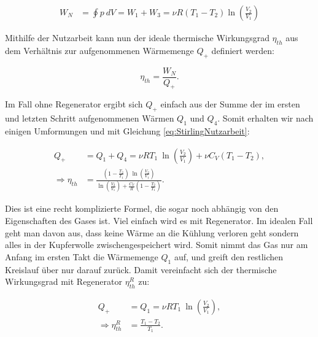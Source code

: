 \documentclass{article}
\begin{document}
\begin{equation}
    \begin{split}
        W_N &= \oint p \ dV = W_1 + W_3 = \nu R (T_1 - T_2) \ln{\left( \frac{V_2}{V_1} \right)}
    \end{split}
    \label{eq:StirlingNutzarbeit}
\end{equation}

Mithilfe der Nutzarbeit kann nun der ideale thermische Wirkungsgrad $\eta_{th}$ aus dem Verhältnis zur aufgenommenen Wärmemenge $Q_+$ definiert werden:

\begin{equation}
    \eta_{th} = \frac{W_N}{Q_+}.
\end{equation}

Im Fall ohne Regenerator ergibt sich $Q_+$ einfach aus der Summe der im ersten und letzten Schritt aufgenommenen Wärmen $Q_1$ und $Q_4$. Somit erhalten wir nach einigen Umformungen und mit Gleichung \ref{eq:StirlingNutzarbeit}:

\begin{equation}
    \begin{split}
        Q_+ &= Q_1 + Q_4 = \nu R T_1 \ \ln{\left( \frac{V_2}{V_1} \right)} + \nu C_V (T_1 - T_2), \\ 
        \Rightarrow \eta_{th} &= \frac{\left( 1 - \frac{T_2}{T_1} \right) \ \ln{\left( \frac{V_2}{V_1} \right)}}{\ln{\left( \frac{V_2}{V_1} \right)} + \frac{C_V}{R} \left( 1 - \frac{T_2}{T_1} \right)}.
    \end{split}
\end{equation}

Dies ist eine recht komplizierte Formel, die sogar noch abhängig von den Eigenschaften des Gases ist. Viel einfach wird es mit Regenerator. Im idealen Fall geht man davon aus, dass keine Wärme an die Kühlung verloren geht sondern alles in der Kupferwolle zwischengespeichert wird. Somit nimmt das Gas nur am Anfang im ersten Takt die Wärmemenge $Q_1$ auf, und greift den restlichen Kreislauf über nur darauf zurück. Damit vereinfacht sich der thermische Wirkungsgrad mit Regenerator $\eta_{th}^R$ zu:

\begin{equation}
    \begin{split}
        Q_+ &= Q_1= \nu R T_1 \ \ln{\left( \frac{V_2}{V_1} \right)}, \\ 
        \Rightarrow \eta_{th}^R &= \frac{T_1 - T_2}{T_1}.
    \end{split}
\end{equation}
\end{document}

